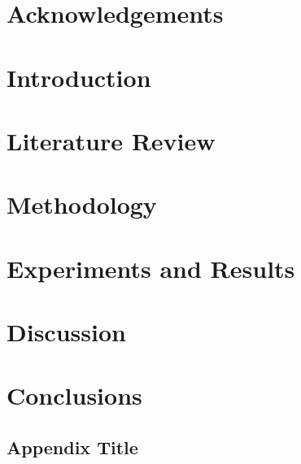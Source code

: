 \documentclass[11pt,twoside]{book}
\begin{document}

\chapter*{Acknowledgements}


\clearpage
\newpage
\tableofcontents
\newpage
\listoffigures
\newpage
\listoftables
\glsaddall
\printglossary[type=\acronymtype,title=List of Acronyms]

\chapter{Introduction}


\chapter{Literature Review}


\chapter{Methodology}


\chapter{Experiments and Results}


\chapter{Discussion} %


\chapter{Conclusions}




\begin{appendices}

\chapter{Appendix Title}


\end{appendices}
\end{document}
